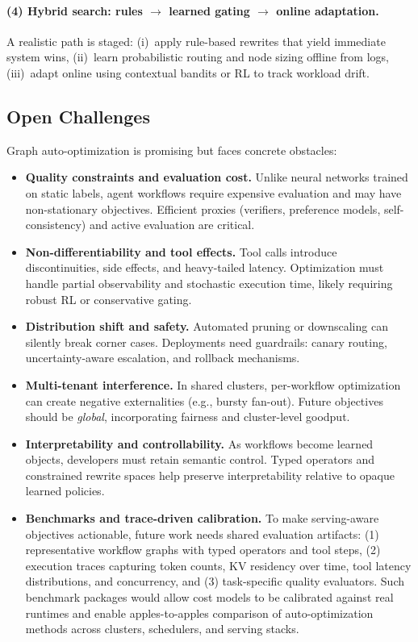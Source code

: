 \paragraph{(4) Hybrid search: rules $\rightarrow$ learned gating $\rightarrow$ online adaptation.}
A realistic path is staged:
(i)~apply rule-based rewrites that yield immediate system wins,
(ii)~learn probabilistic routing and node sizing offline from logs,
(iii)~adapt online using contextual bandits or RL to track workload drift.

\subsection{Open Challenges}
\label{sec:open_challenges}

Graph auto-optimization is promising but faces concrete obstacles:

\begin{itemize}
  \item \textbf{Quality constraints and evaluation cost.}
  Unlike neural networks trained on static labels, agent workflows require expensive evaluation and may have non-stationary objectives. Efficient proxies (verifiers, preference models, self-consistency) and active evaluation are critical.

  \item \textbf{Non-differentiability and tool effects.}
  Tool calls introduce discontinuities, side effects, and heavy-tailed latency. Optimization must handle partial observability and stochastic execution time, likely requiring robust RL or conservative gating.

  \item \textbf{Distribution shift and safety.}
  Automated pruning or downscaling can silently break corner cases. Deployments need guardrails: canary routing, uncertainty-aware escalation, and rollback mechanisms.

  \item \textbf{Multi-tenant interference.}
  In shared clusters, per-workflow optimization can create negative externalities (e.g., bursty fan-out). Future objectives should be \emph{global}, incorporating fairness and cluster-level goodput.

  \item \textbf{Interpretability and controllability.}
  As workflows become learned objects, developers must retain semantic control. Typed operators and constrained rewrite spaces help preserve interpretability relative to opaque learned policies.

  \item \textbf{Benchmarks and trace-driven calibration.}
  To make serving-aware objectives actionable, future work needs shared evaluation artifacts:
  (1) representative workflow graphs with typed operators and tool steps, (2) execution traces capturing
  token counts, KV residency over time, tool latency distributions, and concurrency, and (3) task-specific
  quality evaluators.
  Such benchmark packages would allow cost models to be calibrated against real runtimes and enable
  apples-to-apples comparison of auto-optimization methods across clusters, schedulers, and serving stacks.
\end{itemize}